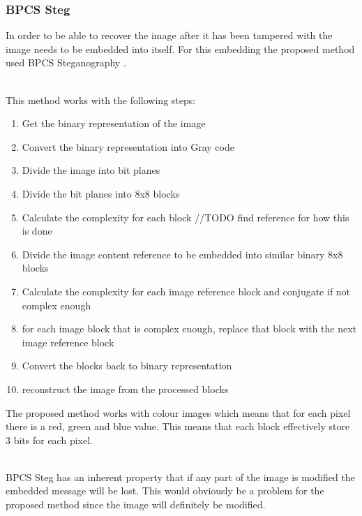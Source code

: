 \documentclass[12pt]{article}
\begin{document}
\subsubsection{BPCS Steg}
\label{bpcsSteg}
In order to be able to recover the image after it has been tampered with the image needs to be embedded into itself. 
For this embedding the proposed method used BPCS Steganography \cite{beaullieubpcs}.

\hspace{0pt} \\
This method works with the following steps:
\begin{enumerate}
  \item Get the binary representation of the image
  \item Convert the binary representation into Gray code
  \item Divide the image into bit planes
  \item Divide the bit planes into 8x8 blocks
  \item Calculate the complexity for each block //TODO find reference for how this is done
  \item Divide the image content reference to be embedded into similar binary 8x8 blocks
  \item Calculate the complexity for each image reference block and conjugate if not complex enough
  \item for each image block that is complex enough, replace that block with the next image reference block
  \item Convert the blocks back to binary representation
  \item reconstruct the image from the processed blocks 
\end{enumerate}
The proposed method works with colour images which means that for each pixel there is a red, green and blue value. This means that each block effectively store 3 bits for each pixel. 

\hspace{0pt} \\
BPCS Steg has an inherent property that if any part of the image is modified the embedded message will be lost.
This would obviously be a problem for the proposed method since the image will definitely be modified.
\end{document}

